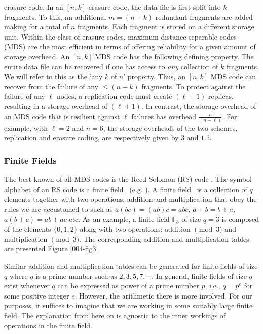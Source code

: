 \begin{multicols}{2}		
\noindent
 erasure code.  In an $[n,k]$ erasure code, the data file is first split into $k$ fragments.  To this, an additional $m=(n-k)$ redundant fragments are added making for a total of $n$ fragments.  Each fragment is stored on a different storage unit. Within the class of erasure codes, maximum distance separable codes (MDS) are the most efficient in terms of offering reliability for a given amount of storage overhead.  An $[n,k]$ MDS code has the following defining property.  The entire data file can be recovered if one has access to {\em any} collection of $k$ fragments.  We will refer to this as the `any $k$ of $n$' property. Thus, an $[n,k]$ MDS code can recover from the failure of any $\leq (n-k)$ fragments. To protect against the failure of any $\ell$ nodes, a replication code must create $(\ell+1)$ replicas, resulting in a storage overhead of $(\ell+1)$. In contrast, the storage overhead of an MDS code that is resilient against $\ell$ failures has overhead $\frac{n}{(n-\ell)}$. For example, with $\ell=2$ and $n=6$, the storage overheads of the two schemes, replication and erasure coding, are respectively given by $3$ and $1.5$.\\[-22pt]

\subsubsection{Finite Fields}

\vskip -3pt
	
The best known of all MDS codes is the Reed-Solomon (RS) code \cite{ReeSol}.  The symbol alphabet of an RS code is a finite field \fq\ (e.g. \cite[Ch.~3]{MacSlo}).  A finite field \fq\ is a collection of $q$ elements together with two operations, addition and multiplication that obey the rules we are accustomed to such as $a(bc)=(ab)c=abc$, $a+b=b+a$, $a(b+c)=ab+ac$ etc. As an example, a finite field $\mathbb{F}_3$ of size $q=3$ is composed of the elements $\{0,1,2\}$ along with two operations: addition $\! \! \pmod{3}$ and multiplication $\! \! \pmod{3}$.  The corresponding addition and multiplication tables are presented Figure \ref{004-fig3}.

Similar addition and multiplication tables can be generated for finite fields of size $q$ where $q$ is a prime number such as $2,3,5,7,\cdots$.  In general, finite fields of size $q$ exist whenever $q$ can be expressed as power of a prime number $p$, i.e., $q=p^e$ for some positive integer $e$.  However, the arithmetic there is more involved. For our purposes, it suffices to imagine that we are working in some suitably large finite field. The explanation from here on is agnostic to the inner workings of operations in the finite field.\\[-22pt] 


\end{multicols}
